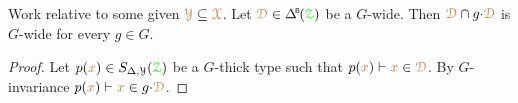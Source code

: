 \begin{corollary}\label{corol_intersectionGwide}
  Work relative to some given ${\color{brown}\EuScript Y}\subseteq{\color{brown}\EuScript X}$.
  Let $\mrD\in\BDelta(\grZ)$ be a $G$-wide.
  Then ${\color{brown}\EuScript D}\cap g{\cdot}{\color{brown}\EuScript D}$ is $G$-wide for every $g\in G$.
\end{corollary}

\begin{proof}
  Let $p({\color{brown} x})\in S_{\Delta,\EuScript Y}({\color{green}\EuScript Z})$ be a $G$-thick type such that $p({\color{brown} x})\vdash{\color{brown}x}\in{\color{brown}\EuScript D}$.
  By $G$-invariance $p({\color{brown} x})\vdash{\color{brown}x}\in g{\cdot}{\color{brown}\EuScript D}$.
\end{proof}





